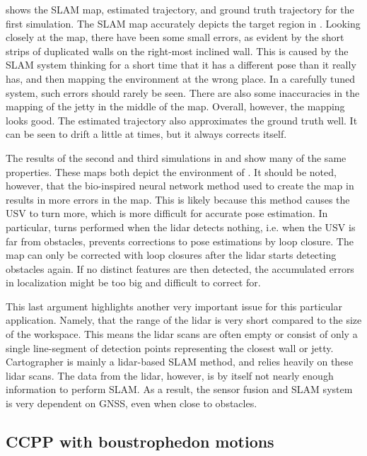  shows the SLAM map, estimated trajectory, and ground truth trajectory for the first simulation. The SLAM map accurately depicts the target region in . Looking closely at the map, there have been some small errors, as evident by the short strips of duplicated walls on the right-most inclined wall. This is caused by the SLAM system thinking for a short time that it has a different pose than it really has, and then mapping the environment at the wrong place. In a carefully tuned system, such errors should rarely be seen. There are also some inaccuracies in the mapping of the jetty in the middle of the map. Overall, however, the mapping looks good. The estimated trajectory also approximates the ground truth well. It can be seen to drift a little at times, but it always corrects itself.

The results of the second and third simulations in  and  show many of the same properties. These maps both depict the environment of . It should be noted, however, that the bio-inspired neural network method used to create the map in  results in more errors in the map. This is likely because this method causes the USV to turn more, which is more difficult for accurate pose estimation. In particular, turns performed when the lidar detects nothing, i.e. when the USV is far from obstacles, prevents corrections to pose estimations by loop closure. The map can only be corrected with loop closures after the lidar starts detecting obstacles again. If no distinct features are then detected, the accumulated errors in localization might be too big and difficult to correct for. 

This last argument highlights another very important issue for this particular application. Namely, that the range of the lidar is very short compared to the size of the workspace. This means the lidar scans are often empty or consist of only a single line-segment of detection points representing the closest wall or jetty. Cartographer is mainly a lidar-based SLAM method, and relies heavily on these lidar scans. The data from the lidar, however, is by itself not nearly enough information to perform SLAM. As a result, the sensor fusion and SLAM system is very dependent on GNSS, even when close to obstacles. 


\subsection{CCPP with boustrophedon motions}


